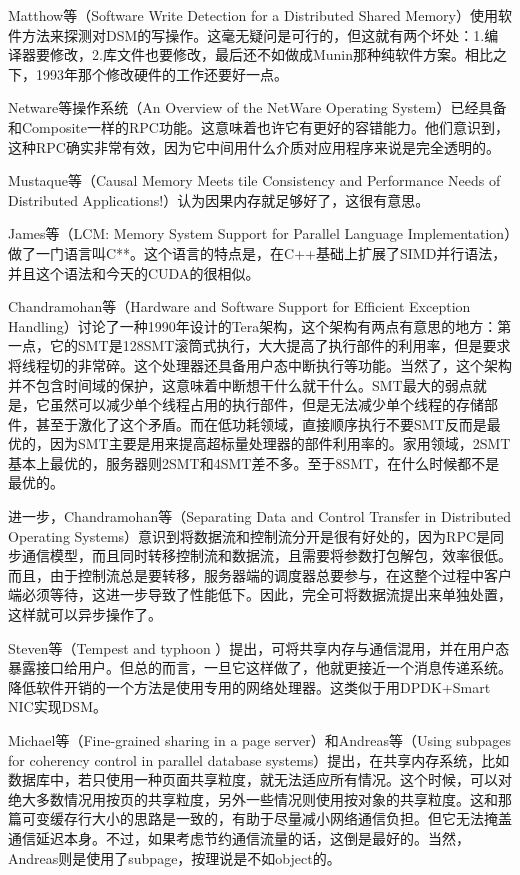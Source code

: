 \documentclass[a4paper,twoside]{scrbook}
\begin{document}
Matthow等（Software Write Detection for a Distributed Shared Memory）使用软件方法来探测对DSM的写操作。这毫无疑问是可行的，但这就有两个坏处：1.编译器要修改，2.库文件也要修改，最后还不如做成Munin那种纯软件方案。相比之下，1993年那个修改硬件的工作还要好一点。

Netware等操作系统（An Overview of the NetWare Operating System）已经具备和Composite一样的RPC功能。这意味着也许它有更好的容错能力。他们意识到，这种RPC确实非常有效，因为它中间用什么介质对应用程序来说是完全透明的。

Mustaque等（Causal Memory Meets tile Consistency and Performance Needs of Distributed Applications!）认为因果内存就足够好了，这很有意思。

James等（LCM: Memory System Support for Parallel Language Implementation）做了一门语言叫C**。这个语言的特点是，在C++基础上扩展了SIMD并行语法，并且这个语法和今天的CUDA的很相似。

Chandramohan等（Hardware and Software Support for Efficient Exception Handling）讨论了一种1990年设计的Tera架构，这个架构有两点有意思的地方：第一点，它的SMT是128SMT滚筒式执行，大大提高了执行部件的利用率，但是要求将线程切的非常碎。这个处理器还具备用户态中断执行等功能。当然了，这个架构并不包含时间域的保护，这意味着中断想干什么就干什么。SMT最大的弱点就是，它虽然可以减少单个线程占用的执行部件，但是无法减少单个线程的存储部件，甚至于激化了这个矛盾。而在低功耗领域，直接顺序执行不要SMT反而是最优的，因为SMT主要是用来提高超标量处理器的部件利用率的。家用领域，2SMT基本上最优的，服务器则2SMT和4SMT差不多。至于8SMT，在什么时候都不是最优的。

进一步，Chandramohan等（Separating Data and Control Transfer in Distributed Operating Systems）意识到将数据流和控制流分开是很有好处的，因为RPC是同步通信模型，而且同时转移控制流和数据流，且需要将参数打包解包，效率很低。而且，由于控制流总是要转移，服务器端的调度器总要参与，在这整个过程中客户端必须等待，这进一步导致了性能低下。因此，完全可将数据流提出来单独处置，这样就可以异步操作了。

Steven等（Tempest and typhoon ）提出，可将共享内存与通信混用，并在用户态暴露接口给用户。但总的而言，一旦它这样做了，他就更接近一个消息传递系统。降低软件开销的一个方法是使用专用的网络处理器。这类似于用DPDK+Smart NIC实现DSM。

Michael等（Fine-grained sharing in a page server）和Andreas等（Using subpages for coherency control in parallel database systems）提出，在共享内存系统，比如数据库中，若只使用一种页面共享粒度，就无法适应所有情况。这个时候，可以对绝大多数情况用按页的共享粒度，另外一些情况则使用按对象的共享粒度。这和那篇可变缓存行大小的思路是一致的，有助于尽量减小网络通信负担。但它无法掩盖通信延迟本身。不过，如果考虑节约通信流量的话，这倒是最好的。当然，Andreas则是使用了subpage，按理说是不如object的。
\end{document}
